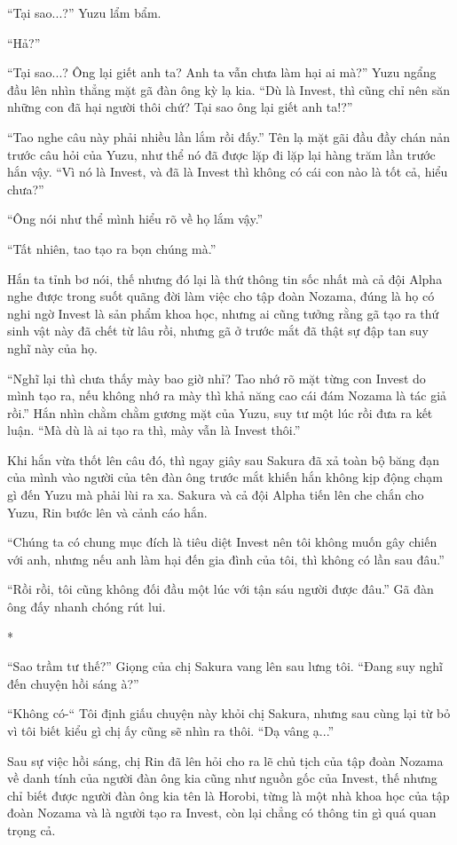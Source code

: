 {``Tại sao...?'' Yuzu lẩm bẩm.

``Hả?''

``Tại sao...? Ông lại giết anh ta? Anh ta vẫn chưa làm hại ai mà?'' Yuzu
ngẩng đầu lên nhìn thẳng mặt gã đàn ông kỳ lạ kia. ``Dù là Invest, thì
cũng chỉ nên săn những con đã hại người thôi chứ? Tại sao ông lại giết
anh ta!?''

``Tao nghe câu này phải nhiều lần lắm rồi đấy.'' Tên lạ mặt gãi đầu đầy
chán nản trước câu hỏi của Yuzu, như thể nó đã được lặp đi lặp lại hàng
trăm lần trước hắn vậy. ``Vì nó là Invest, và đã là Invest thì không có
cái con nào là tốt cả, hiểu chưa?''

``Ông nói như thể mình hiểu rõ về họ lắm vậy.''

``Tất nhiên, tao tạo ra bọn chúng mà.''

Hắn ta tỉnh bơ nói, thế nhưng đó lại là thứ thông tin sốc nhất mà cả đội
Alpha nghe được trong suốt quãng đời làm việc cho tập đoàn Nozama, đúng
là họ có nghi ngờ Invest là sản phẩm khoa học, nhưng ai cũng tưởng rằng
gã tạo ra thứ sinh vật này đã chết từ lâu rồi, nhưng gã ở trước mắt đã
thật sự đập tan suy nghĩ này của họ.

``Nghĩ lại thì chưa thấy mày bao giờ nhỉ? Tao nhớ rõ mặt từng con Invest
do mình tạo ra, nếu không nhớ ra mày thì khả năng cao cái đám Nozama là
tác giả rồi.'' Hắn nhìn chằm chằm gương mặt của Yuzu, suy tư một lúc rồi
đưa ra kết luận. ``Mà dù là ai tạo ra thì, mày vẫn là Invest thôi.''

Khi hắn vừa thốt lên câu đó, thì ngay giây sau Sakura đã xả toàn bộ băng
đạn của mình vào người của tên đàn ông trước mắt khiến hắn không kịp
động chạm gì đến Yuzu mà phải lùi ra xa. Sakura và cả đội Alpha tiến lên
che chắn cho Yuzu, Rin bước lên và cảnh cáo hắn.

``Chúng ta có chung mục đích là tiêu diệt Invest nên tôi không muốn gây
chiến với anh, nhưng nếu anh làm hại đến gia đình của tôi, thì không có
lần sau đâu.''

``Rồi rồi, tôi cũng không đối đầu một lúc với tận sáu người được đâu.''
Gã đàn ông đấy nhanh chóng rút lui.

*

``Sao trầm tư thế?'' Giọng của chị Sakura vang lên sau lưng tôi. ``Đang
suy nghĩ đến chuyện hồi sáng à?''

``Không có-`` Tôi định giấu chuyện này khỏi chị Sakura, nhưng sau cùng
lại từ bỏ vì tôi biết kiểu gì chị ấy cũng sẽ nhìn ra thôi. ``Dạ vâng
ạ...''

Sau sự việc hồi sáng, chị Rin đã lên hỏi cho ra lẽ chủ tịch của tập đoàn
Nozama về danh tính của người đàn ông kia cũng như nguồn gốc của Invest,
thế nhưng chỉ biết được người đàn ông kia tên là Horobi, từng là một nhà
khoa học của tập đoàn Nozama và là người tạo ra Invest, còn lại chẳng có
thông tin gì quá quan trọng cả.

}
